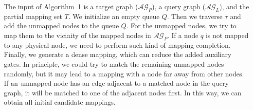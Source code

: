\documentclass[journal]{IEEEtran}
\begin{document}
The input of Algorithm~1 %
 is a target graph ($\mathcal{AG}_{P}$), a query graph ($\mathcal{AG}_{L}$), and the partial mapping set $T$. We initialize an empty queue $Q$.
Then we traverse $\tau$ and add the unmapped nodes to the queue $Q$. For the unmapped nodes, we try to map them to the vicinity of the mapped nodes in $\mathcal{AG}_{P}$. If a node $\textit{q}$ is not mapped to any physical node, we need to perform such kind of mapping completion. Finally, we generate a dense mapping, which can reduce the added auxiliary gates. In principle, we could try to match the remaining unmapped nodes randomly, but it may lead to a mapping with a node far away from other nodes. If an unmapped node has an edge adjacent to a matched node in the query graph, it will be matched to one of the adjacent nodes first.  In this way, we can obtain all initial candidate mappings.
\end{document}
